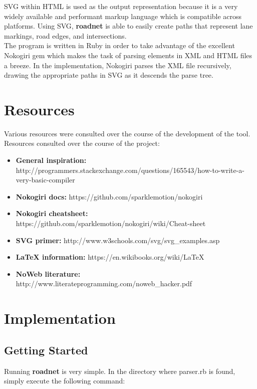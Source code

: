 \documentclass{article}
\begin{document}
SVG within HTML is used as the output representation because it is a very widely available and performant markup language which is compatible across platforms. Using SVG, \textbf{roadnet} is able to easily create paths that represent lane markings, road edges, and intersections.\\

The program is written in Ruby in order to take advantage of the excellent Nokogiri gem which makes the task of parsing elements in XML and HTML files a breeze. In the implementation, Nokogiri parses the XML file recursively, drawing the appropriate paths in SVG as it descends the parse tree.\\

\section{Resources}
Various resources were consulted over the course of the development of the tool. \\

Resources consulted over the course of the project:
\begin{itemize}  
\item \textbf{General inspiration:} http://programmers.stackexchange.com/questions/165543/how-to-write-a-very-basic-compiler
\item \textbf{Nokogiri docs:} https://github.com/sparklemotion/nokogiri
\item \textbf{Nokogiri cheatsheet:} https://github.com/sparklemotion/nokogiri/wiki/Cheat-sheet
\item \textbf{SVG primer:} http://www.w3schools.com/svg/svg\_examples.asp
\item \textbf{LaTeX information:} https://en.wikibooks.org/wiki/LaTeX
\item \textbf{NoWeb literature:} http://www.literateprogramming.com/noweb\_hacker.pdf
\end{itemize}

\section{Implementation}

\subsection{Getting Started}

Running \textbf{roadnet} is very simple. In the directory where parser.rb is found, simply execute the following command:
\end{document}
